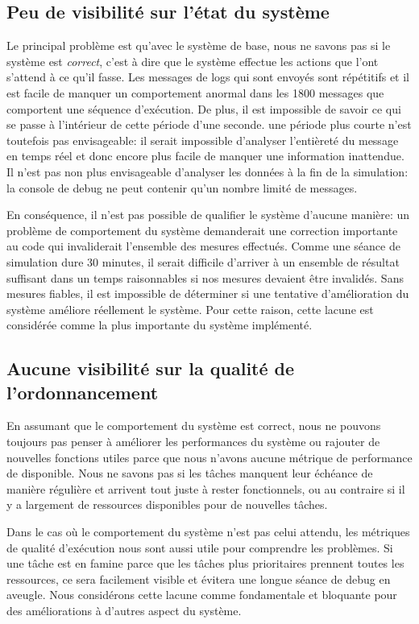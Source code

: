 \documentclass[journal]{IEEEtran}
\begin{document}
\subsection{Peu de visibilité sur l'état du système}

Le principal problème est qu'avec le système de base, nous ne savons pas si le système est \emph{correct}, c'est à dire que le système effectue les actions que l'ont s'attend à ce qu'il fasse. Les messages de logs qui sont envoyés sont répétitifs et il est facile de manquer un comportement anormal dans les 1800 messages que comportent une séquence d'exécution. De plus, il est impossible de savoir ce qui se passe à l'intérieur de cette période d'une seconde. une période plus courte n'est toutefois pas envisageable: il serait impossible d'analyser l'entièreté du message en temps réel et donc encore plus facile de manquer une information inattendue. Il n'est pas non plus envisageable d'analyser les données à la fin de la simulation: la console de debug ne peut contenir qu'un nombre limité de messages.

En conséquence, il n'est pas possible de qualifier le système d'aucune manière: un problème de comportement du système demanderait une correction importante au code qui invaliderait l'ensemble des mesures effectués. Comme une séance de simulation dure 30 minutes, il serait difficile d'arriver à un ensemble de résultat suffisant dans un temps raisonnables si nos mesures devaient être invalidés. Sans mesures fiables, il est impossible de déterminer si une tentative d'amélioration du système améliore réellement le système. Pour cette raison, cette lacune est considérée comme la plus importante du système implémenté.

\subsection{Aucune visibilité sur la qualité de l'ordonnancement}

En assumant que le comportement du système est correct, nous ne pouvons toujours pas penser à améliorer les performances du système ou rajouter de nouvelles fonctions utiles parce que nous n'avons aucune métrique de performance de disponible. Nous ne savons pas si les tâches manquent leur échéance de manière régulière et arrivent tout juste à rester fonctionnels, ou au contraire si il y a largement de ressources disponibles pour de nouvelles tâches.

Dans le cas où le comportement du système n'est pas celui attendu, les métriques de qualité d'exécution nous sont aussi utile pour comprendre les problèmes. Si une tâche est en famine parce que les tâches plus prioritaires prennent toutes les ressources, ce sera facilement visible et évitera une longue séance de debug en aveugle. Nous considérons cette lacune comme fondamentale et bloquante pour des améliorations à d'autres aspect du système.
\end{document}
